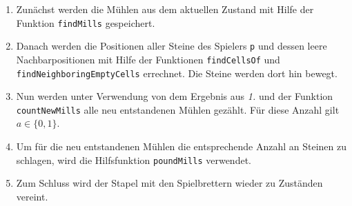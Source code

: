 \documentclass[11pt]{article}
\providecommand{\tightlist}{%
      \setlength{\itemsep}{0pt}\setlength{\parskip}{0pt}}
\begin{document}
\begin{enumerate}
\def\labelenumi{\arabic{enumi}.}
\tightlist
\item
  Zunächst werden die Mühlen aus dem aktuellen Zustand mit Hilfe der
  Funktion \texttt{findMills} gespeichert.
\item
  Danach werden die Positionen aller Steine des Spielers \texttt{p} und
  dessen leere Nachbarpositionen mit Hilfe der Funktionen
  \texttt{findCellsOf} und \texttt{findNeighboringEmptyCells} errechnet.
  Die Steine werden dort hin bewegt.
\item
  Nun werden unter Verwendung von dem Ergebnis aus \emph{1.} und der
  Funktion \texttt{countNewMills} alle neu entstandenen Mühlen gezählt.
  Für diese Anzahl gilt \(a \in \{0,1\}\).
\item
  Um für die neu entstandenen Mühlen die entsprechende Anzahl an Steinen
  zu schlagen, wird die Hilfsfunktion \texttt{poundMills} verwendet.
\item
  Zum Schluss wird der Stapel mit den Spielbrettern wieder zu Zuständen
  vereint.
\end{enumerate}
\end{document}
